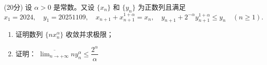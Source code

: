 \documentclass[loose]{ExBook}
\begin{document}
\begin{qitems}
    \begin{bbox}
        \qitem (20分) 设 \( \alpha > 0 \) 是常数。又设 \(\{ x_n \}\) 和 \(\{ y_n \}\) 为正数列且满足
        \[
        x_1 = 2024, \quad y_1 = 20251109, \quad x_{n+1} + x_{n+1}^{1+\alpha} = x_n, \quad y_{n+1} + 2^{-\alpha} y_{n+1}^{1+\alpha} \leq y_n \quad (n \geq 1).
        \]
        \begin{enumerate}[label=(\arabic*)]
            \item 证明数列 \(\{ n x_n^\alpha \}\) 收敛并求极限；
            \item 证明：
            \(
            \overline{\lim_{n\to +\infty}}ny_n^{\alpha}\leq\dfrac{2^{\alpha}}{\alpha}
            \)
        \end{enumerate}
    \end{bbox}

\end{qitems}
\end{document}

